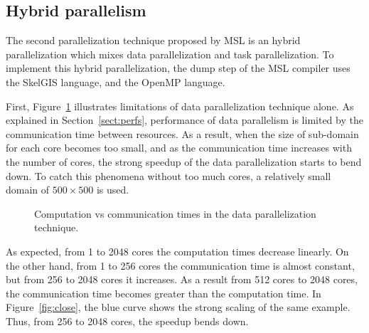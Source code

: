 \subsection{Hybrid parallelism}

The second parallelization technique proposed by MSL is an hybrid parallelization which mixes data parallelization and task parallelization. To implement this hybrid parallelization, the dump step of the MSL compiler uses the SkelGIS language, and the OpenMP language.

First, Figure~\ref{fig:limit} illustrates limitations of data parallelization technique alone. As explained in Section~\ref{sect:perfs}, performance of data parallelism is limited by the communication time between resources. As a result, when the size of sub-domain for each core becomes too small, and as the communication time increases with the number of cores, the strong speedup of the data parallelization starts to bend down. To catch this phenomena without too much cores, a relatively small domain of $500 \times 500$ is used.

\begin{figure}[!h]\begin{center}
  \caption{Computation vs communication times in the data parallelization technique.}
  \label{fig:limit}
\end{center}\end{figure}

As expected, from 1 to 2048 cores the computation times decrease linearly. On the other hand, from 1 to 256 cores the communication time is almost constant, but from 256 to 2048 cores it increases. As a result from 512 cores to 2048 cores, the communication time becomes greater than the computation time. In Figure~\ref{fig:close}, the blue curve shows the strong scaling of the same example. Thus, from 256 to 2048 cores, the speedup bends down.


